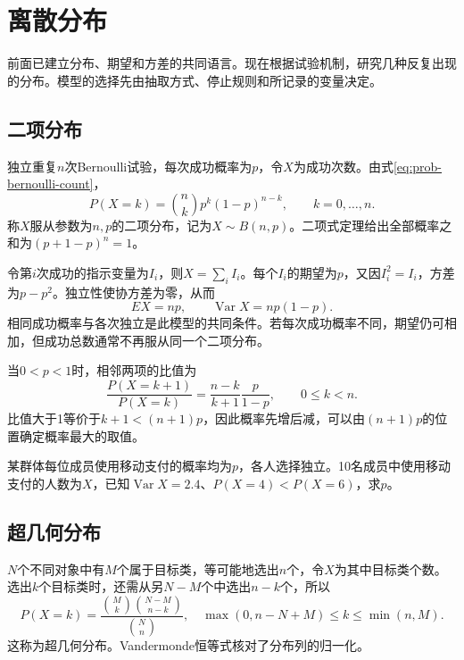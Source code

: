 \FloatBarrier
\newpage
\section{离散分布}
\label{sec:prob-discrete}

前面已建立分布、期望和方差的共同语言。现在根据试验机制，研究几种反复出现的分布。模型的选择先由抽取方式、停止规则和所记录的变量决定。

\subsection{二项分布}

独立重复\(n\)次Bernoulli试验，每次成功概率为\(p\)，令\(X\)为成功次数。由式\eqref{eq:prob-bernoulli-count}，
\begin{equation}\label{eq:prob-binomial-distribution}
 P(X=k)=\binom nkp^k(1-p)^{n-k},\qquad k=0,\ldots,n.
\end{equation}
称\(X\)服从参数为\(n,p\)的{\heiti 二项分布}，记为\(X\sim B(n,p)\)。二项式定理给出全部概率之和为\((p+1-p)^n=1\)。

令第\(i\)次成功的指示变量为\(I_i\)，则\(X=\sum_iI_i\)。每个\(I_i\)的期望为\(p\)，又因\(I_i^2=I_i\)，方差为\(p-p^2\)。独立性使协方差为零，从而
\begin{equation}\label{eq:prob-binomial-characteristics}
 EX=np,\qquad \operatorname{Var}X=np(1-p).
\end{equation}
相同成功概率与各次独立是此模型的共同条件。若每次成功概率不同，期望仍可相加，但成功总数通常不再服从同一个二项分布。

当\(0<p<1\)时，相邻两项的比值为
\[
 \frac{P(X=k+1)}{P(X=k)}=\frac{n-k}{k+1}\frac{p}{1-p},
 \qquad 0\le k<n.
\]
比值大于1等价于\(k+1<(n+1)p\)，因此概率先增后减，可以由\((n+1)p\)的位置确定概率最大的取值。

\begin{example}
某群体每位成员使用移动支付的概率均为\(p\)，各人选择独立。10名成员中使用移动支付的人数为\(X\)，已知\(\operatorname{Var}X=2.4\)、\(P(X=4)<P(X=6)\)，求\(p\)。
\end{example}

\subsection{超几何分布}

\(N\)个不同对象中有\(M\)个属于目标类，等可能地选出\(n\)个，令\(X\)为其中目标类个数。选出\(k\)个目标类时，还需从另\(N-M\)个中选出\(n-k\)个，所以
\begin{equation}\label{eq:prob-hypergeometric}
 P(X=k)=\frac{\binom Mk\binom{N-M}{n-k}}{\binom Nn},
 \quad \max(0,n-N+M)\le k\le\min(n,M).
\end{equation}
这称为{\heiti 超几何分布}。Vandermonde恒等式核对了分布列的归一化。


